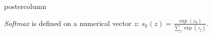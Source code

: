 \documentclass{beamer}
\begin{document}
\begin{frame}[fragile]{}
\begin{columns}
\begin{column}{.31\textwidth}
\begin{beamercolorbox}[center]{postercolumn}
\begin{minipage}{.98\textwidth}
{\begin{myblock}{}
  \emph{Softmax} is defined on a numerical vector $z$: $ s_k(z) = \frac{\exp(z_k)}{\sum_{j}\exp(z_j)} $.
  
\end{myblock}
}

\end{minipage}
\end{beamercolorbox}
\end{column}

\end{columns}
\end{frame}
\end{document}
